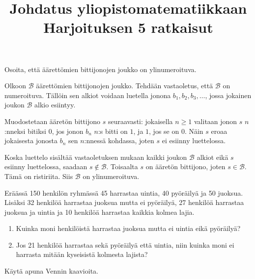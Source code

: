 \documentclass[11pt,a4paper]{amsart}
\title{Johdatus yliopistomatematiikkaan\\Harjoituksen 5 ratkaisut}
\date{}
\author{}
\begin{document}

\begin{exercise}
  Osoita, että äärettömien bittijonojen joukko on ylinumeroituva.
\end{exercise}

\begin{solution}
  Olkoon \(\mathcal{B}\) äärettömien bittijonojen joukko. Tehdään
  vastaoletus, että \(\mathcal{B}\) on numeroituva. Tällöin sen alkiot
  voidaan luetella jonona \(b_1, b_2, b_3, \dots\), jossa jokainen
  joukon \(\mathcal{B}\) alkio esiintyy.

  Muodostetaan ääretön bittijono \(s\) seuraavasti: jokaisella
  \(n \geq 1\) valitaan jonon \(s\) \(n\):nneksi bitiksi \(0\), jos
  jonon \(b_n\) \(n\):s bitti on \(1\), ja \(1\), jos se on \(0\).
  Näin \(s\) eroaa jokaisesta jonosta \(b_n\) sen \(n\):nnessä
  kohdassa, joten \(s\) ei esiinny luettelossa.

  Koska luettelo sisältää vastaoletuksen mukaan kaikki joukon
  \(\mathcal{B}\) alkiot eikä \(s\) esiinny luettelossa, saadaan
  \(s \notin \mathcal{B}\). Toisaalta \(s\) on ääretön bittijono, joten
  \(s \in \mathcal{B}\). Tämä on ristiriita. Siis \(\mathcal{B}\) on
  ylinumeroituva.
\end{solution}

\begin{exercise}
  Eräässä 150 henkilön ryhmässä 45 harrastaa uintia, 40 pyöräilyä ja 50 juoksua.
  Lisäksi 32 henkilöä harrastaa juoksua mutta ei pyöräilyä, 27 henkilöä
  harrastaa juoksua ja uintia ja 10 henkilöä harrastaa kaikkia kolmea lajia.
\begin{enumerate}[label=\alph*), nosep]
  \item Kuinka moni henkilöistä harrastaa juoksua mutta ei uintia
    eikä pyöräilyä?
  \item Jos 21 henkilöä harrastaa sekä pyöräilyä että uintia, niin kuinka
    moni ei harrasta mitään kyseisistä kolmesta lajista?
\end{enumerate}
Käytä apuna Vennin kaavioita.
\end{exercise}
\end{document}
